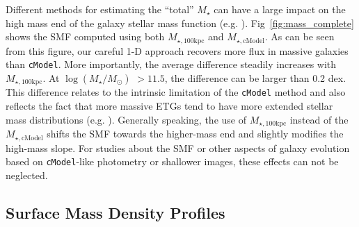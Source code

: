 \documentclass[a4paper,fleqn,usenatbib]{mnras}
\def\cmodel{\texttt{cModel}}
\def\rbcg{\texttt{cenHighMh}}
\def\mstar{{$M_{\star}$}}
\def\logms{{$\log (M_{\star}/M_{\odot})$}}
\def\mtot{{$M_{\star,100\mathrm{kpc}}$}}
\def\mcmodel{{$M_{\star,\mathrm{cModel}}$}}
\begin{document}
    Different methods for estimating the ``total'' \mstar{} can have a large impact on 
    the high mass end of the galaxy stellar mass function (e.g. \citealt{Bernardi2013, 
    DSouza2014, DSouza2015, Bernardi2016a}). 
    Fig~\ref{fig:mass_complete} shows the SMF computed using both \mtot{} and \mcmodel{}. 
    As can be seen from this figure, our careful 1-D approach recovers more flux 
    in massive galaxies than \texttt{cModel}. 
    More importantly, the average difference steadily increases with \mtot{}. 
    At \logms{} $>11.5$, the difference can be larger than 0.2 dex. 
    This difference relates to the intrinsic limitation of the \texttt{cModel} method 
    and also reflects the fact that more massive ETGs tend to have more extended 
    stellar mass distributions (e.g. \citealt{Graham2003}). 
    Generally speaking, the use of \mtot{} instead of the \mcmodel{} shifts the SMF 
    towards the higher-mass end and slightly modifies the high-mass slope. 
    For studies about the SMF or other aspects of galaxy evolution based on 
    \cmodel{}-like photometry or shallower images, these effects can not be neglected.

\subsection{Surface Mass Density Profiles}
    \label{ssec:sbp_compare}
\end{document}
